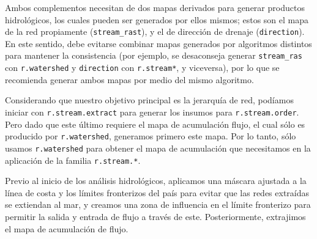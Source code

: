 \documentclass[spanish]{article}
\begin{document}
Ambos complementos necesitan de dos mapas derivados para generar
productos hidrológicos, los cuales pueden ser generados por ellos
mismos; estos son el mapa de la red propiamente (\texttt{stream\_rast}),
y el de dirección de drenaje (\texttt{direction}). En este sentido, debe
evitarse combinar mapas generados por algoritmos distintos para mantener
la consistencia (por ejemplo, se desaconseja generar
\texttt{stream\_ras} con \texttt{r.watershed} y \texttt{direction} con
\texttt{r.stream*}, y viceversa), por lo que se recomienda generar ambos
mapas por medio del mismo algoritmo.

Considerando que nuestro objetivo principal es la jerarquía de red,
podíamos iniciar con \texttt{r.stream.extract} para generar los insumos
para \texttt{r.stream.order}. Pero dado que este último requiere el mapa
de acumulación flujo, el cual sólo es producido por
\texttt{r.watershed}, generamos primero este mapa. Por lo tanto, sólo
usamos \texttt{r.watershed} para obtener el mapa de acumulación que
necesitamos en la aplicación de la familia \texttt{r.stream.*}.

Previo al inicio de los análisis hidrológicos, aplicamos una máscara
ajustada a la línea de costa y los límites fronterizos del país para
evitar que las redes extraídas se extiendan al mar, y creamos una zona
de influencia en el límite fronterizo para permitir la salida y entrada
de flujo a través de este. Posteriormente, extrajimos el mapa de
acumulación de flujo.
\end{document}
